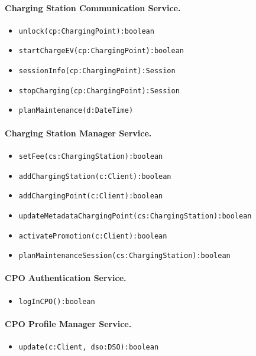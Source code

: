 \paragraph{Charging Station Communication Service.}
\begin{itemize}
    \item \verb|unlock(cp:ChargingPoint):boolean|
    \item \verb|startChargeEV(cp:ChargingPoint):boolean|
    \item \verb|sessionInfo(cp:ChargingPoint):Session|
    \item \verb|stopCharging(cp:ChargingPoint):Session|
    \item \verb|planMaintenance(d:DateTime)|
\end{itemize}

\paragraph{Charging Station Manager Service.}
\begin{itemize}
    \item \verb|setFee(cs:ChargingStation):boolean|
    \item \verb|addChargingStation(c:Client):boolean|
    \item \verb|addChargingPoint(c:Client):boolean|
    \item \verb|updateMetadataChargingPoint(cs:ChargingStation):boolean|
    \item \verb|activatePromotion(c:Client):boolean|
    \item \verb|planMaintenanceSession(cs:ChargingStation):boolean|
\end{itemize}

\paragraph{CPO Authentication Service.}
\begin{itemize}
    \item \verb|logInCPO():boolean|
\end{itemize}

\paragraph{CPO Profile Manager Service.}
\begin{itemize}
    \item \verb|update(c:Client, dso:DSO):boolean|
\end{itemize}

